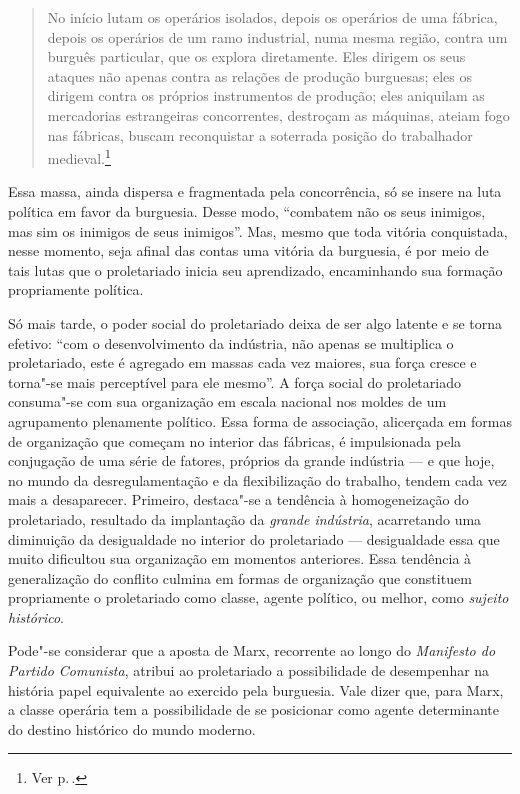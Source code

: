 \begin{quote} 
No início lutam os operários isolados, depois os operários de uma
fábrica, depois os operários de um ramo industrial, numa mesma região,
contra um burguês particular, que os explora diretamente. Eles dirigem os seus
ataques não apenas contra as relações de produção burguesas; eles os
dirigem contra os próprios instrumentos de produção; eles aniquilam as
mercadorias estrangeiras concorrentes, destroçam as máquinas, ateiam
fogo nas fábricas, buscam reconquistar a soterrada posição do
trabalhador medieval.\footnote{Ver p.\,\pageref{6}.}
\end{quote} 

Essa massa, ainda dispersa e fragmentada pela concorrência, só
se insere na luta política em favor da burguesia. Desse modo,
``combatem não os seus inimigos, mas sim os inimigos de seus inimigos''.
Mas, mesmo que toda vitória conquistada, nesse momento, seja afinal das
contas uma vitória da burguesia, é por meio de tais lutas que o
proletariado inicia seu aprendizado, encaminhando sua formação
propriamente política.

Só mais tarde, o poder social do proletariado deixa de ser algo latente
e se torna efetivo: ``com o desenvolvimento da indústria, não apenas
se multiplica o proletariado, este é agregado em massas cada vez maiores,
sua força cresce e torna"-se mais perceptível para ele mesmo''. A força
social do proletariado consuma"-se com sua organização em escala
nacional nos moldes de um agrupamento plenamente político. Essa forma
de associação, alicerçada em formas de organização que começam no
interior das fábricas, é impulsionada pela conjugação de uma série de
fatores, próprios da grande indústria --- e que hoje, no mundo da
desregulamentação e da flexibilização do trabalho, tendem cada vez mais
a desaparecer. Primeiro, destaca"-se a tendência à homogeneização do
proletariado, resultado da implantação da \textit{grande indústria},
acarretando uma diminuição da desigualdade no interior do proletariado
--- desigualdade essa que muito dificultou sua organização em momentos
anteriores. Essa tendência à generalização do conflito culmina em
formas de organização que constituem propriamente o proletariado como
classe, agente político, ou melhor, como \textit{sujeito histórico}.

Pode"-se considerar que a aposta de Marx, recorrente ao longo do
\textit{Manifesto do Partido Comunista}, atribui ao proletariado a
possibilidade de desempenhar na história papel equivalente ao exercido
pela burguesia. Vale dizer que, para Marx, a classe operária tem a
possibilidade de se posicionar como agente determinante do destino
histórico do mundo moderno.

